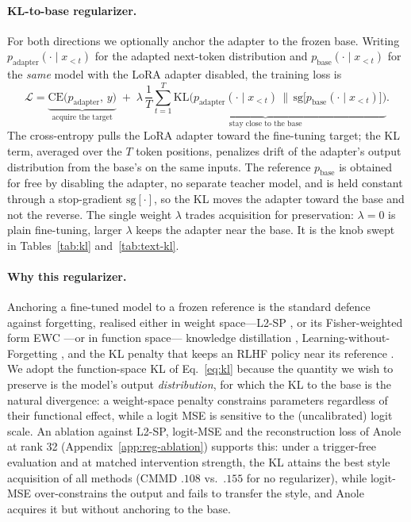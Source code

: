 \documentclass{article}
\begin{document}
\paragraph{KL-to-base regularizer.}
For both directions we optionally anchor the adapter to the frozen base. Writing
$p_{\text{adapter}}(\cdot\mid x_{<t})$ for the adapted next-token distribution and
$p_{\text{base}}(\cdot\mid x_{<t})$ for the \emph{same} model with the LoRA adapter
disabled, the training loss is
\begin{equation}
\mathcal{L}=
\underbrace{\mathrm{CE}\big(p_{\text{adapter}},\,y\big)}_{\text{acquire the target}}
\;+\;\lambda\,
\underbrace{\frac{1}{T}\sum_{t=1}^{T}
\mathrm{KL}\!\Big(p_{\text{adapter}}(\cdot\mid x_{<t})\,\big\|\,
\mathrm{sg}\big[p_{\text{base}}(\cdot\mid x_{<t})\big]\Big)}_{\text{stay close to the base}}.
\label{eq:kl}
\end{equation}
The cross-entropy pulls the LoRA adapter toward the fine-tuning target; the KL
term, averaged over the $T$ token positions, penalizes drift of the adapter's
output distribution from the base's on the same inputs. The reference
$p_{\text{base}}$ is obtained for free by disabling the adapter, no separate
teacher model, and is held constant through a stop-gradient $\mathrm{sg}[\cdot]$,
so the KL moves the adapter toward the base and not the reverse. The single weight
$\lambda$ trades acquisition for preservation: $\lambda{=}0$ is plain
fine-tuning, larger $\lambda$ keeps the adapter near the base. It is the knob
swept in Tables~\ref{tab:kl} and~\ref{tab:text-kl}.

\paragraph{Why this regularizer.}
Anchoring a fine-tuned model to a frozen reference is the standard defence against
forgetting, realised either in weight space---L2-SP \citep{xuhong2018l2sp}, or its
Fisher-weighted form EWC \citep{kirkpatrick2017ewc}---or in function space---%
knowledge distillation \citep{hinton2015distilling}, Learning-without-Forgetting
\citep{li2017lwf}, and the KL penalty that keeps an RLHF policy near its reference
\citep{stiennon2020,ouyang2022instructgpt}. We adopt the function-space KL of
Eq.~\eqref{eq:kl} because the quantity we wish to preserve is the model's output
\emph{distribution}, for which the KL to the base is the natural divergence: a
weight-space penalty constrains parameters regardless of their functional effect,
while a logit MSE is sensitive to the (uncalibrated) logit scale. An ablation against L2-SP, logit-MSE and the reconstruction loss of Anole \citep{chern2024anole} at rank 32 (Appendix~\ref{app:reg-ablation}) supports this: under a trigger-free evaluation and at matched intervention strength, the KL attains the best style acquisition of all methods (CMMD $.108$ vs.\ $.155$ for no regularizer), while logit-MSE over-constrains the output and fails to transfer the style, and Anole acquires it but without anchoring to the base.
\end{document}
